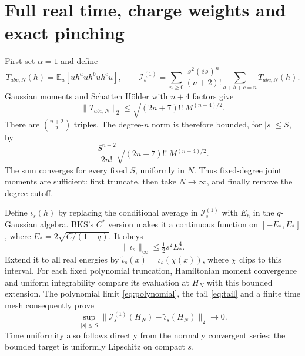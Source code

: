 \documentclass[11pt,a4paper]{article}
\newcommand{\EE}{\mathbb E}
\begin{document}
\newpage
\section{Full real time, charge weights and exact pinching}
First set $\alpha=1$ and define
\begin{equation}
 T_{abc,N}(h)=\EE_u[u h^a u h^b u h^c u],\qquad
 \mathcal I_s^{(1)}=
 \sum_{n\ge0}\frac{s^2(is)^n}{(n+2)!}
             \sum_{a+b+c=n}T_{abc,N}(h).
 \label{eq:series}
\end{equation}
Gaussian moments and Schatten H\"older with $n+4$ factors give
\begin{equation}
 \|T_{abc,N}\|_2\le\sqrt{(2n+7)!!}\,M^{(n+4)/2}.
\end{equation}
There are $\binom{n+2}{2}$ triples. The degree-$n$ norm is therefore
bounded, for $|s|\le S$, by
\begin{equation}
 \frac{S^{n+2}}{2n!}\sqrt{(2n+7)!!}\,M^{(n+4)/2}.
 \label{eq:tail}
\end{equation}
The sum converges for every fixed $S$, uniformly in $N$.
Thus fixed-degree joint moments are sufficient: first truncate,
then take $N\to\infty$, and finally remove the degree cutoff.

Define $\iota_s(h)$ by replacing the conditional average in
$\mathcal I_s^{(1)}$ with $E_h$ in the $q$-Gaussian algebra.
BKS's $C^*$ version \cite{BKS} makes it a continuous function on
$[-E_*,E_*]$, where $E_*=2\sqrt{C/(1-q)}$. It obeys
\begin{equation}
 \|\iota_s\|_\infty\le\tfrac12s^2 E_*^4.
\end{equation}
Extend it to all real energies by $\widetilde\iota_s(x)=\iota_s(\chi(x))$,
where $\chi$ clips to this interval. For each fixed polynomial
truncation, Hamiltonian moment convergence and uniform integrability
compare its evaluation at $H_N$ with this bounded extension.
The polynomial limit \eqref{eq:polynomial}, the tail \eqref{eq:tail}
and a finite time mesh consequently prove
\begin{equation}
 \sup_{|s|\le S}\|\mathcal I_s^{(1)}(H_N)
                    -\widetilde\iota_s(H_N)\|_2\to0.
 \label{eq:time}
\end{equation}
Time uniformity also follows directly from the normally convergent
series; the bounded target is uniformly Lipschitz on compact $s$.
\end{document}

